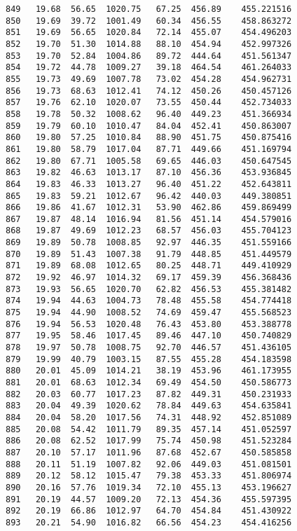 \documentclass[11pt]{article}
\begin{document}
\begin{tcolorbox}[breakable, size=fbox, boxrule=.5pt, pad at break*=1mm, opacityfill=0]
\begin{Verbatim}[commandchars=\\\{\}]
849   19.68  56.65  1020.75   67.25  456.89    455.221516
850   19.69  39.72  1001.49   60.34  456.55    458.863272
851   19.69  56.65  1020.84   72.14  455.07    454.496203
852   19.70  51.30  1014.88   88.10  454.94    452.997326
853   19.70  52.84  1004.86   89.72  444.64    451.561347
854   19.72  44.78  1009.27   39.18  464.54    461.264033
855   19.73  49.69  1007.78   73.02  454.28    454.962731
856   19.73  68.63  1012.41   74.12  450.26    450.457126
857   19.76  62.10  1020.07   73.55  450.44    452.734033
858   19.78  50.32  1008.62   96.40  449.23    451.366934
859   19.79  60.10  1010.47   84.04  452.41    450.863007
860   19.80  57.25  1010.84   88.90  451.75    450.875416
861   19.80  58.79  1017.04   87.71  449.66    451.169794
862   19.80  67.71  1005.58   69.65  446.03    450.647545
863   19.82  46.63  1013.17   87.10  456.36    453.936845
864   19.83  46.33  1013.27   96.40  451.22    452.643811
865   19.83  59.21  1012.67   96.42  440.03    449.380851
866   19.86  41.67  1012.31   53.90  462.86    459.869499
867   19.87  48.14  1016.94   81.56  451.14    454.579016
868   19.87  49.69  1012.23   68.57  456.03    455.704123
869   19.89  50.78  1008.85   92.97  446.35    451.559166
870   19.89  51.43  1007.38   91.79  448.85    451.449579
871   19.89  68.08  1012.65   80.25  448.71    449.410929
872   19.92  46.97  1014.32   69.17  459.39    456.368436
873   19.93  56.65  1020.70   62.82  456.53    455.381482
874   19.94  44.63  1004.73   78.48  455.58    454.774418
875   19.94  44.90  1008.52   74.69  459.47    455.568523
876   19.94  56.53  1020.48   76.43  453.80    453.388778
877   19.95  58.46  1017.45   89.46  447.10    450.740829
878   19.97  50.78  1008.75   92.70  446.57    451.436105
879   19.99  40.79  1003.15   87.55  455.28    454.183598
880   20.01  45.09  1014.21   38.19  453.96    461.173955
881   20.01  68.63  1012.34   69.49  454.50    450.586773
882   20.03  60.77  1017.23   87.82  449.31    450.231933
883   20.04  49.39  1020.62   78.84  449.63    454.635841
884   20.04  58.20  1017.56   74.31  448.92    452.851089
885   20.08  54.42  1011.79   89.35  457.14    451.052597
886   20.08  62.52  1017.99   75.74  450.98    451.523284
887   20.10  57.17  1011.96   87.68  452.67    450.585858
888   20.11  51.19  1007.82   92.06  449.03    451.081501
889   20.12  58.12  1015.47   79.38  453.33    451.806974
890   20.16  57.76  1019.34   72.10  455.13    453.196627
891   20.19  44.57  1009.20   72.13  454.36    455.597395
892   20.19  66.86  1012.97   64.70  454.84    451.430922
893   20.21  54.90  1016.82   66.56  454.23    454.416256

\end{Verbatim}
\end{tcolorbox}
\end{document}
